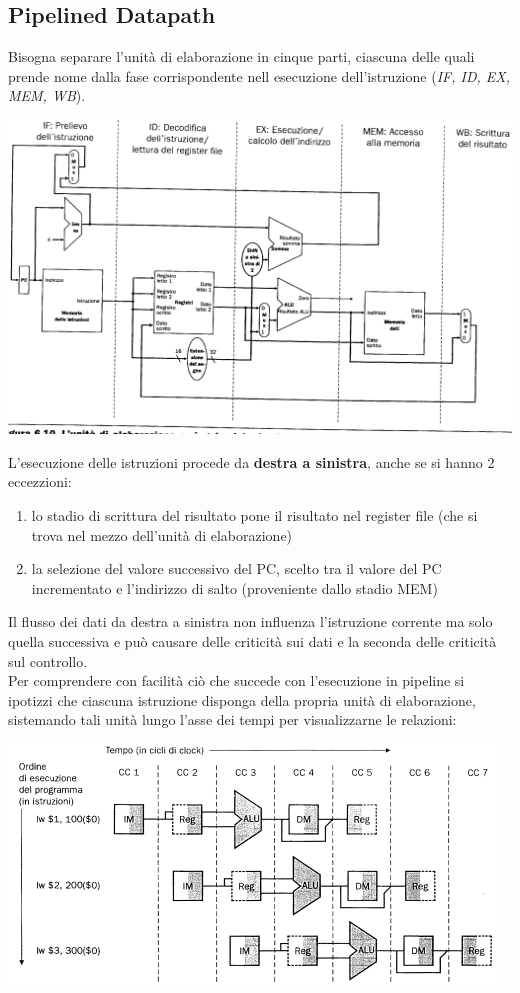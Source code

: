 \documentclass[a4paper,12pt, oneside]{book}
\begin{document}
\subsection{Pipelined Datapath}
Bisogna separare l'unità di elaborazione in
cinque parti, ciascuna delle quali prende nome dalla fase
corrispondente nell esecuzione dell'istruzione (\textit{IF, ID, EX,
  MEM, WB}).\\
\begin{center}
  \includegraphics[scale = 0.7]{img/pipe.png}
\end{center}
L'esecuzione delle istruzioni procede da \textbf{destra a sinistra},
anche se si hanno 2 eccezzioni:
\begin{enumerate}
  \item lo stadio di scrittura del risultato pone il risultato nel
  register file (che si trova nel mezzo dell'unità di elaborazione)
  \item la selezione del valore successivo del PC, scelto tra il valore del PC incrementato e l'indirizzo di salto (proveniente dallo stadio MEM)
\end{enumerate}
Il flusso dei dati da destra a sinistra non influenza l'istruzione
corrente ma solo quella successiva e può causare
delle criticità sui dati e la seconda delle criticità sul controllo.\\
Per comprendere con facilità ciò che succede con l'esecuzione in
pipeline si ipotizzi che ciascuna istruzione disponga della propria
unità di elaborazione, sistemando tali unità lungo l'asse dei tempi
per visualizzarne le relazioni:
\begin{center}
  \includegraphics[scale = 0.7]{img/pipe2.png}
\end{center}
\end{document}

